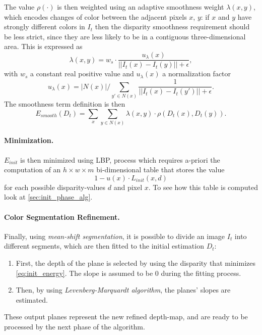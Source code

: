 \documentclass[notitlepage,english]{hgbreport}
\newcommand{\Acronym}[1]{{#1}}
\newcommand{\LBP}{\Acronym{LBP}}
\begin{document}
The value $\rho(\cdot)$ is then weighted using an adaptive smoothness weight $\lambda(x,y)$, which encodes changes of color between the adjacent pixels $x$, $y$: if $x$ and $y$ have strongly different colors in $I_t$ then the disparity smoothness requirement should be less strict, since they are less likely to be in a contiguous three-dimensional area. This is expressed as 
$$\lambda(x,y) = w_s\cdot \frac{u_\lambda(x)}{|| I_t(x) - I_t(y)|| + \epsilon},$$
with $w_s$ a constant real positive value and $u_{\lambda}(x)$ a normalization factor
$$
	u_{\lambda}(x) = {|N(x)|}\big/{\sum_{y'\in N(x)} \frac{1}{||I_t(x) - I_t(y')||+\epsilon}}.
$$
The smoothness term definition is then
\begin{equation}
	E_{smooth}(D_t) = \sum_x \sum_{y\in N(x)} \lambda(x,y)\cdot \rho(D_t(x),D_t(y)).
\end{equation}

\paragraph{Minimization.}
$E_{init}$ is then minimized using \LBP{}, process which requires a-priori the computation of an $h\times w\times m$ bi-dimensional table that stores the value
$$1-u(x)\cdot L_{init}(x,d)$$ for each possible disparity-values $d$ and pixel $x$. To see how this table is computed look at \cref{sec:init_phase_alg}.




\paragraph{Color Segmentation Refinement.}
Finally, using \emph{mean-shift segmentation}, it is possible to divide an image $I_t$ into different segments, which are then fitted to the initial estimation $D_t$:
\begin{enumerate}
\item First, the depth of the plane is selected by using the disparity that minimizes \cref{eq:init_energy}. The slope is assumed to be 0 during the fitting process.
\item Then, by using \emph{Levenberg-Marquardt algorithm}, the planes' slopes are estimated.
\end{enumerate}
These output planes represent the new refined depth-map, and are ready to be processed by the next phase of the algorithm.%
\end{document}
